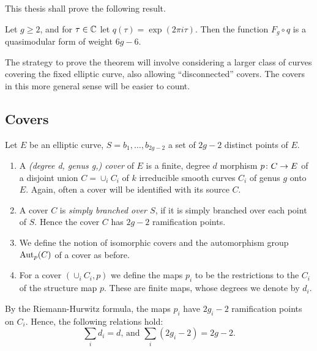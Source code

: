 This thesis shall prove the following result.

\begin{thm}[Dijkgraaf]
 Let $g\geq 2$, and for $\tau\in\mathbb{C}$ let $q(\tau)=\exp(2\pi i\tau)$. Then the function $F_g\circ q$ is a quasimodular form of weight $6g-6$.
\end{thm}

The strategy to prove the theorem will involve considering a larger class of curves covering the fixed elliptic curve, also allowing ``disconnected'' covers. The covers in this more general sense will be easier to count.

\subsection{Covers}

\begin{defi} Let $E$ be an elliptic curve, $S={b_1,\dotsc,b_{2g-2}}$ a set of $2g-2$ distinct points of $E$.
 \begin{enumerate}
  \item A \emph{(degree d, genus g,) cover} of $E$ is a finite, degree $d$ morphism $p\colon C\to E$ of a disjoint union $C=\cup_i C_i$ of $k$ irreducible smooth curves $C_i$ of genus $g$ onto $E$. Again, often a cover will be identified with its source $C$.
  
  \item A cover $C$ is \emph{simply branched over $S$}, if it is simply branched over each point of $S$. Hence the cover $C$ has $2g-2$ ramification points.
  
  \item We define the notion of isomorphic covers and the automorphism group $\operatorname{Aut}_p(C)$ of a cover as before.

  \item For a cover $(\cup_i C_i,p)$ we define the maps $p_i$ to be the restrictions to the $C_i$ of the structure map $p$. These are finite maps, whose degrees we denote by $d_i$.
 \end{enumerate}
\end{defi}

\begin{rmk}
 By the Riemann-Hurwitz formula, the maps $p_i$ have $2g_i-2$ ramification points on $C_i$. Hence, the following relations hold:
 \[\sum_i d_i=d\text{, and }\sum_i (2g_i-2)=2g-2.\]
\end{rmk}

